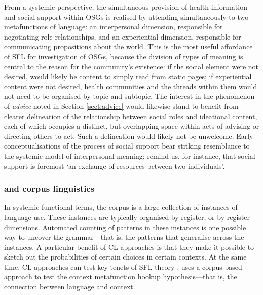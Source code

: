 From a systemic perspective, the simultaneous provision of health information and social support within \glspl{OSG} is realised by  attending simultaneously to two metafunctions of language: an interpersonal dimension, responsible for negotiating role relationships, and an experiential dimension, responsible for communicating propositions about the world. This is the most useful affordance of \gls{SFL} for investigation of \glspl{OSG}, because the division of types of meaning is central to the reason for the community's existence: if the social element were not desired,  would likely be content to simply read from static pages; if experiential content were not desired, health communities and the threads within them would not need to be organised by topic and subtopic. The interest in the phenomenon of \emph{advice} noted in Section \ref{sect:advice} would likewise stand to benefit from clearer delineation of the relationship between social roles and ideational content, each of which occupies a distinct, but overlapping space within acts of advising or directing others to act. Such a delineation would likely not be unwelcome. Early conceptualisations of the process of social support bear striking resemblance to the systemic model of interpersonal meaning: \textcite[p.~11]{shumaker1984toward} remind us, for instance, that social support is foremost `an exchange of resources between two individuals'.

\subsubsection{ and corpus linguistics}

In systemic\hyp{}functional terms, the \gls{corpus} is a large collection of instances of language use. These instances are typically organised by register, or by register dimensions. Automated counting of patterns in these instances is one possible way to uncover the grammar---that is, the patterns that generalise across the instances. A particular benefit of \gls{CL} approaches is that they make it possible to sketch out the probabilities of certain choices in certain contexts. At the same time, \gls{CL} approaches can test key tenets of \gls{SFL} theory \cite{honnibal_creating_2007}. \textcite{clarke_patterns_2012} uses a corpus-based approach to test the context metafunction hookup hypothesis---that is, the connection between language and context.

